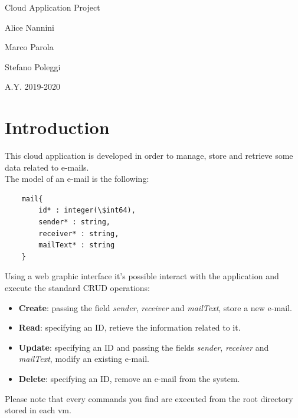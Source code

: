 \documentclass{article}
\begin{document}
\begin{titlepage}
\begin{center}
{\Huge Cloud Application Project \par}
\vspace{18mm}
{\huge Alice Nannini \par}
{\huge Marco Parola \par}
{\huge Stefano Poleggi \par}
\vspace{18mm}
A.Y. 2019-2020
\end{center}

\end{titlepage}

\tableofcontents\thispagestyle{empty}
\clearpage

\section{Introduction}
This cloud application is developed in order to manage, store and retrieve some data related to e-mails.\\
The model of an e-mail is the following:
\begin{verbatim}
    mail{
        id* : integer(\$int64),
        sender* : string,
        receiver* : string,
        mailText* : string
    }
\end{verbatim}
Using a web graphic interface it's possible interact with the application and execute the standard CRUD operations:
\begin{itemize}
\item \textbf{Create}: passing the field \textit{sender}, \textit{receiver} and \textit{mailText}, store a new e-mail.
\item \textbf{Read}: specifying an ID, retieve the information related to it.
\item \textbf{Update}: specifying an ID and passing the fields \textit{sender}, \textit{receiver} and \textit{mailText}, modify an existing e-mail.
\item \textbf{Delete}: specifying an ID, remove an e-mail from the system.
\end{itemize}
Please note that every commands you find are executed from the root directory stored in each vm.
\end{document}
